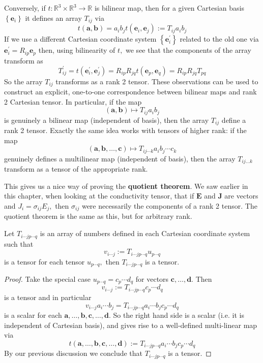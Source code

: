 Conversely, if $t: \mathbb{R}^{3} \times \mathbb{R}^{3} \rightarrow \mathbb{R}$ is bilinear map, then for a given Cartesian basis $\left\{\mathbf{e}_{i}\right\}$ it defines an array $T_{i j}$ via
\[
t(\mathbf{a}, \mathbf{b})=a_{i} b_{j} t\left(\mathbf{e}_{i}, \mathbf{e}_{j}\right):=T_{i j} a_{i} b_{j}
\]
If we use a different Cartesian coordinate system $\left\{\mathbf{e}_{i}^{\prime}\right\}$ related to the old one via $\mathbf{e}_{i}^{\prime}=R_{i p} \mathbf{e}_{p}$ then, using bilinearity of $t,$ we see that the components of the array transform as
\[
T_{i j}^{\prime}=t\left(\mathbf{e}_{i}^{\prime}, \mathbf{e}_{j}^{\prime}\right)=R_{i p} R_{j q} t\left(\mathbf{e}_{p}, \mathbf{e}_{q}\right)=R_{i p} R_{j q} T_{p q}
\]
So the array $T_{i j}$ transforms as a rank 2 tensor. These observations can be used to construct an explicit, one-to-one correspondence between bilinear maps and rank 2 Cartesian tensor. In particular, if the map
\[
(\mathbf{a}, \mathbf{b}) \mapsto T_{i j} a_{i} b_{j}
\]
is genuinely a bilinear map (independent of basis), then the array $T_{i j}$ define a rank 2 tensor. Exactly the same idea works with tensors of higher rank: if the map
\[
(\mathbf{a}, \mathbf{b}, \ldots, \mathbf{c}) \mapsto T_{i j \cdots k} a_{i} b_{j} \cdots c_{k}
\]
genuinely defines a multilinear map (independent of basis), then the array $T_{i j \ldots k}$ transform as a tensor of the appropriate rank.

This gives us a nice way of proving the \textbf{quotient theorem}. We saw earlier in this chapter,
when looking at the conductivity tensor, that if $\mathbf{E}$ and $\mathbf{J}$ are vectors and $J_{i}=\sigma_{i j} E_{j},$ then $\sigma_{i j}$ were necessarily the components of a rank 2 tensor. The quotient theorem is the same as this, but for arbitrary rank.

\begin{proposition}
    Let $T_{i \cdots j p \cdots q}$ is an array of numbers defined in each Cartesian coordinate system such that
    \[
    v_{i \cdots j}:=T_{i \cdots j p \cdots q} u_{p \cdots q}
    \]
    is a tensor for each tensor $u_{p \cdots q},$ then $T_{i \cdots j p \cdots q}$ is a tensor.
\end{proposition}
\begin{proof}
    Take the special case $u_{p \cdots q}=c_{p} \cdots d_{q}$ for vectors $\mathbf{c}, \ldots, \mathbf{d}$. Then
    \[
    v_{i \cdots j}:=T_{i \cdots j p \cdots q} c_{p} \cdots d_{q}
    \]
    is a tensor and in particular
    \[
    v_{i \cdots j} a_{i} \cdots b_{j}=T_{i \cdots j p \cdots q} a_{i} \cdots b_{j} c_{p} \cdots d_{q}
    \]
    is a scalar for each $\mathbf{a}, \ldots, \mathbf{b}, \mathbf{c}, \ldots, \mathbf{d}$. So the right hand side is a scalar (i.e. it is independent of Cartesian basis), and gives rise to a well-defined multi-linear map via
    \[
    t(\mathbf{a}, \ldots, \mathbf{b}, \mathbf{c}, \ldots, \mathbf{d}):=T_{i \cdots j p \cdots q} a_{i} \cdots b_{j} c_{p} \cdots d_{q}
    \]
    By our previous discussion we conclude that $T_{i \cdots j p \cdots q}$ is a tensor.
\end{proof}

